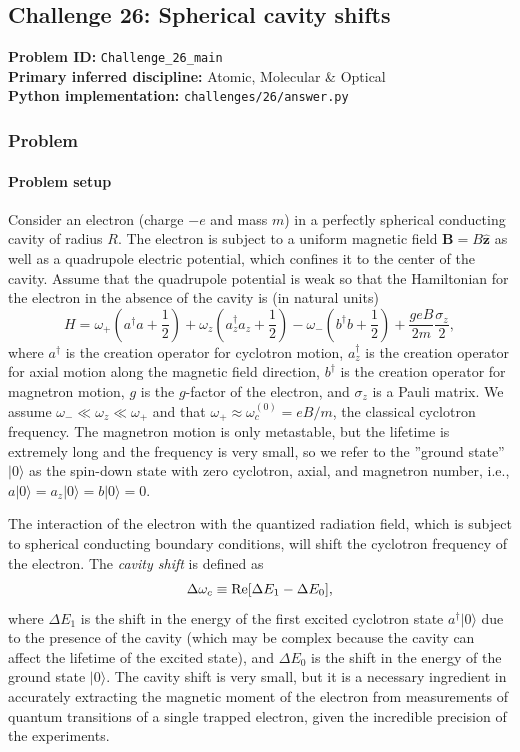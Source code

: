 \subsection[Challenge 26: Spherical cavity shifts]{Challenge 26: Spherical cavity shifts}
\textbf{Problem ID:} \texttt{Challenge\_26\_main}\\
\textbf{Primary inferred discipline:} Atomic, Molecular \& Optical\\
\textbf{Python implementation:} \texttt{challenges/26/answer.py}

\subsubsection*{Problem}
\paragraph*{Problem setup}
Consider an electron (charge $-e$ and mass $m$) in a perfectly spherical conducting cavity of radius $R$. The electron is subject to a uniform magnetic field $\mathbf{B} = B\hat{\mathbf{z}}$ as well as a quadrupole electric potential, which confines it to the center of the cavity. Assume that the quadrupole potential is weak so that the Hamiltonian for the electron in the absence of the cavity is (in natural units)
\begin{equation}
    H = \omega_+ \left(a^\dagger a + \frac{1}{2}\right) + \omega_z \left(a_z^\dagger a_z + \frac{1}{2}\right) - \omega_- \left(b^\dagger b + \frac{1}{2}\right) + \frac{geB}{2m}\frac{\sigma_z}{2},
\end{equation}
where $a^\dagger$ is the creation operator for cyclotron motion, $a_z^\dagger$ is the creation operator for axial motion along the magnetic field direction, $b^\dagger$ is the creation operator for magnetron motion, $g$ is the $g$-factor of the electron, and $\sigma_z$ is a Pauli matrix. We assume $\omega_- \ll \omega_z \ll \omega_+$ and that $\omega_+ \approx \omega_c^{(0)} = eB/m$, the classical cyclotron frequency. The magnetron motion is only metastable, but the lifetime is extremely long and the frequency is very small, so we refer to the ''ground state'' $|0 \rangle$ as the spin-down state with zero cyclotron, axial, and magnetron number, i.e., $a |0 \rangle = a_z |0 \rangle = b |0\rangle = 0$.

The interaction of the electron with the quantized radiation field, which is subject to spherical conducting boundary conditions, will shift the cyclotron frequency of the electron. The \emph{cavity shift} is defined as
\begin{equation}
    \Delta \omega_c \equiv {\rm Re} [ \Delta E_1 - \Delta E_0],
\end{equation}
where $\Delta E_1$ is the shift in the energy of the first excited cyclotron state $a^\dagger |0\rangle$ due to the presence of the cavity (which may be complex because the cavity can affect the lifetime of the excited state), and $\Delta E_0$ is the shift in the energy of the ground state $|0 \rangle$. The cavity shift is very small, but it is a necessary ingredient in accurately extracting the magnetic moment of the electron from measurements of quantum transitions of a single trapped electron, given the incredible precision of the experiments.

